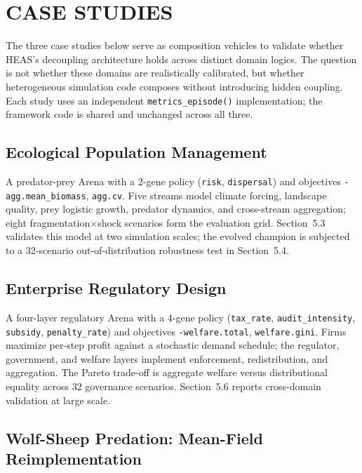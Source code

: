 \documentclass{wscpaperproc}
\begin{document}
\section{CASE STUDIES}

The three case studies below serve as composition vehicles to validate whether HEAS's decoupling architecture holds across distinct domain logics. The question is not whether these domains are realistically calibrated, but whether heterogeneous simulation code composes without introducing hidden coupling. Each study uses an independent \texttt{metrics\_episode()} implementation; the framework code is shared and unchanged across all three.

\subsection{Ecological Population Management}

A predator-prey Arena with a 2-gene policy (\texttt{risk},
\texttt{dispersal}) and objectives \texttt{-agg.mean\_biomass},
\texttt{agg.cv}. Five streams model climate forcing, landscape quality, prey
logistic growth, predator dynamics, and cross-stream aggregation; eight
fragmentation$\times$shock scenarios form the evaluation grid.
Section~5.3 validates this model at two simulation scales; the evolved champion
is subjected to a 32-scenario out-of-distribution robustness test in
Section~5.4.

\subsection{Enterprise Regulatory Design}

A four-layer regulatory Arena with a 4-gene policy
(\texttt{tax\_rate}, \texttt{audit\_intensity}, \texttt{subsidy},
\texttt{penalty\_rate}) and objectives \texttt{-welfare.total},
\texttt{welfare.gini}. Firms maximize per-step profit against a stochastic
demand schedule; the regulator, government, and welfare layers implement
enforcement, redistribution, and aggregation. The Pareto trade-off is
aggregate welfare versus distributional equality across 32 governance scenarios.
Section~5.6 reports cross-domain validation at large scale.

\subsection{Wolf-Sheep Predation: Mean-Field Reimplementation}
\label{sec:wolfsheep}
\end{document}
